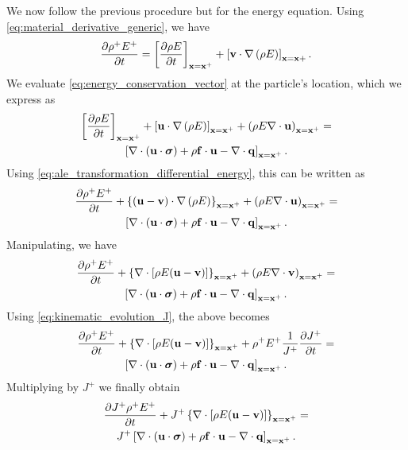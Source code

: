 \documentclass[oneside,a4paper,11pt]{report}
\begin{document}
We now follow the previous procedure but for the energy equation. Using \cref{eq:material_derivative_generic}, we have
\begin{equation}
\label{eq:ale_transformation_differential_energy}
    \frac{\partial \rho^+ E^+}{\partial t} = \left[ \frac{\partial \rho E}{\partial t} \right]_{\mathbf{x} = \mathbf{x}^+} + \left[ \mathbf{v} \cdot \nabla \left( \rho E \right) \right]_{\mathbf{x} = \mathbf{x} +}.
\end{equation}
We evaluate \cref{eq:energy_conservation_vector} at the particle's location, which we express as
\begin{multline*}
\left[ \frac{\partial \rho E}{\partial t} \right]_{\mathbf{x} = \mathbf{x}^+} + \left[ \mathbf{u} \cdot \nabla \left( \rho E \right) \right]_{\mathbf{x} = \mathbf{x}^+} + \left( \rho E \nabla \cdot \mathbf{u} \right)_{\mathbf{x} = \mathbf{x}^+} = \\
\left [ \nabla \cdot (\mathbf{u} \cdot \bm \sigma) + \rho \mathbf{f} \cdot \mathbf{u} - \nabla \cdot \mathbf{q} \right ]_{\mathbf{x} = \mathbf{x}^+}.
\end{multline*}
Using \cref{eq:ale_transformation_differential_energy}, this can be written as
\begin{multline*}
\frac{\partial \rho^+ E^+}{\partial t} + \left\{ (\mathbf{u} - \mathbf{v}) \cdot \nabla \left( \rho E \right) \right\}_{\mathbf{x} = \mathbf{x}^+} + \left( \rho E \nabla \cdot \mathbf{u} \right)_{\mathbf{x} = \mathbf{x}^+} = \\
\left [ \nabla \cdot (\mathbf{u} \cdot \bm \sigma) + \rho \mathbf{f} \cdot \mathbf{u} - \nabla \cdot \mathbf{q} \right ]_{\mathbf{x} = \mathbf{x}^+}.
\end{multline*}
Manipulating, we have
\begin{multline*}
\frac{\partial \rho^+ E^+}{\partial t} + \left \{ \nabla \cdot [ \rho E (\mathbf{u} - \mathbf{v}) ] \right \}_{\mathbf{x} = \mathbf{x}^+} + \left( \rho E \nabla \cdot \mathbf{v} \right)_{\mathbf{x} = \mathbf{x}^+} = \\
\left [ \nabla \cdot (\mathbf{u} \cdot \bm \sigma) + \rho \mathbf{f} \cdot \mathbf{u} - \nabla \cdot \mathbf{q} \right ]_{\mathbf{x} = \mathbf{x}^+}.
\end{multline*}
Using \cref{eq:kinematic_evolution_J}, the above becomes
\begin{multline*}
\frac{\partial \rho^+ E^+}{\partial t} + \left \{ \nabla \cdot [ \rho E (\mathbf{u} - \mathbf{v}) ] \right \}_{\mathbf{x} = \mathbf{x}^+} + \rho^+ E^+ \frac{1}{J^+} \frac{\partial J^+}{\partial t} = \\
\left [ \nabla \cdot (\mathbf{u} \cdot \bm \sigma) + \rho \mathbf{f} \cdot \mathbf{u} - \nabla \cdot \mathbf{q} \right ]_{\mathbf{x} = \mathbf{x}^+}.
\end{multline*}
Multiplying by $J^+$ we finally obtain
\begin{multline}
    \label{eq:ale_differential_energy_conservation}
    \frac{\partial J^+ \rho^+ E^+}{\partial t} + J^+ \left \{ \nabla \cdot [ \rho E (\mathbf{u} - \mathbf{v}) ] \right \}_{\mathbf{x} = \mathbf{x}^+} = \\
    J^+ \left [ \nabla \cdot (\mathbf{u} \cdot \bm \sigma) + \rho \mathbf{f} \cdot \mathbf{u} - \nabla \cdot \mathbf{q} \right ]_{\mathbf{x} = \mathbf{x}^+}.
\end{multline}
\end{document}
